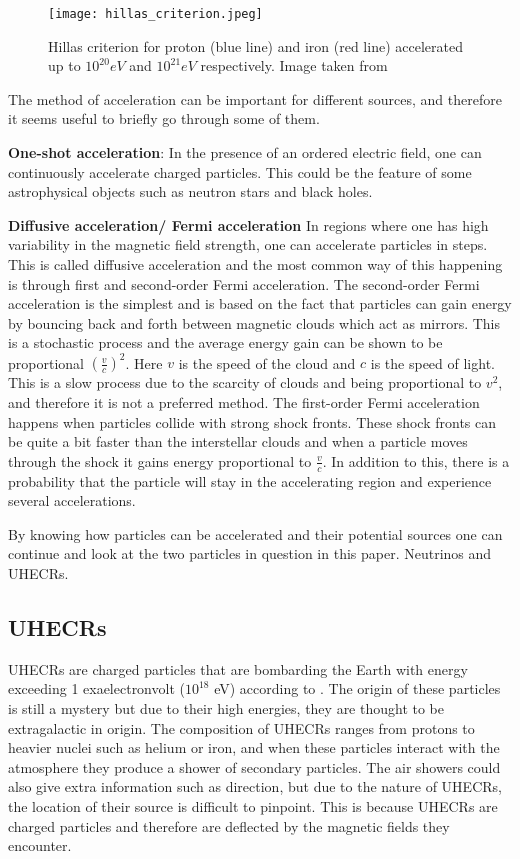 \begin{figure}
    \centering
    \texttt{[image: hillas\_criterion.jpeg]}
    \caption{Hillas criterion for proton (blue line) and iron (red line) accelerated up to $10^{20}eV$ and $10^{21}eV$ respectively. Image taken from \cite{doi:10.1146/annurev-astro-081710-102620}}
    \label{fig:hillas_c}
\end{figure}

The method of acceleration can be important for different sources, and therefore it seems useful to briefly go through some of them.

\textbf{One-shot acceleration}:
In the presence of an ordered electric field, one can continuously accelerate charged particles. This could be the feature of some astrophysical objects such as neutron stars and black holes.%


\textbf{Diffusive acceleration/ Fermi acceleration}
In regions where one has high variability in the magnetic field strength, one can accelerate particles in steps. 
This is called diffusive acceleration and the most common way of this happening is through first and second-order Fermi acceleration.
The second-order Fermi acceleration is the simplest and is based on the fact that particles can gain energy by bouncing back and forth between magnetic clouds which act as mirrors. 
This is a stochastic process and the average energy gain can be shown to be proportional $(\frac{v}{c})^2$. Here $v$ is the speed of the cloud 
and $c$ is the speed of light. This is a slow process due to the scarcity of clouds and being proportional to $v^2$, and therefore it is not a preferred method.
The first-order Fermi acceleration happens when particles collide with strong shock fronts. These shock fronts can be quite a bit faster than the interstellar clouds
and when a particle moves through the shock it gains energy proportional to $\frac{v}{c}$. In addition to this, there is a probability that the particle will stay in the accelerating region and 
experience several accelerations. 

By knowing how particles can be accelerated and their potential sources one can continue and look at the two particles in question in this paper. 
Neutrinos and UHECRs.
\subsection{UHECRs}

UHECRs are charged particles that are bombarding the Earth with energy exceeding 1 exaelectronvolt ($10^{18}$ eV) according to \cite{Alves_Batista_2019}. The origin of 
these particles is still a mystery but due to their high energies, they are thought to be extragalactic in origin.
The composition of UHECRs ranges from protons to heavier nuclei such as helium or iron, and when these particles interact with the atmosphere they produce a shower of secondary particles.
The air showers could also give extra information such as direction, but due to the nature of UHECRs, the location of their source is
difficult to pinpoint. This is because UHECRs are charged particles and therefore are deflected by the magnetic fields they encounter.

